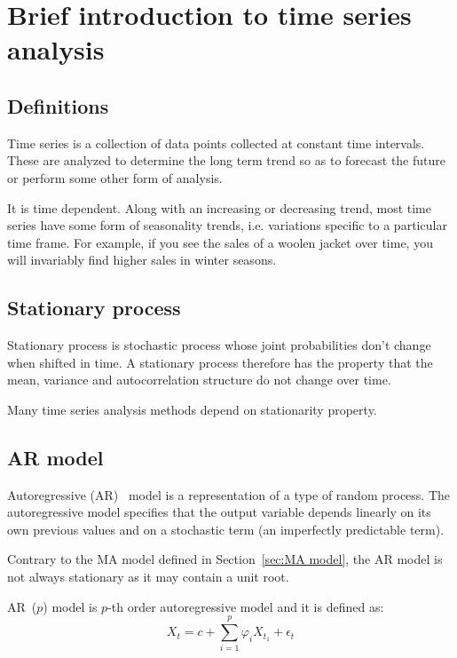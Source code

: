 
\chapter{Brief introduction to time series analysis}
\label{chap:Brief introduction to time series analysis}

\section{Definitions}
\label{sec:Definitions}

Time series is a collection of data points collected at constant time intervals. These are analyzed to determine the long term trend so as to forecast the future or perform some other form of analysis.

It is time dependent. Along with an increasing or decreasing trend, most time series have some form of seasonality trends, i.e. variations specific to a particular time frame. For example, if you see the sales of a woolen jacket over time, you will invariably find higher sales in winter seasons.

\section{Stationary process}
\label{sec:Stationary process}

Stationary process is stochastic process whose joint probabilities don't change when shifted in time. A stationary process therefore has the property that the mean, variance and autocorrelation structure do not change over time.

Many time series analysis methods depend on stationarity property.

\section{AR model}
\label{sec:AR model}

Autoregressive (AR)~\autocite{tsa} model is a representation of a type of random process. The autoregressive model specifies that the output variable depends linearly on its own previous values and on a stochastic term (an imperfectly predictable term).

Contrary to the MA model defined in Section~\ref{sec:MA model}, the AR model is not always stationary as it may contain a unit root.

AR~($p$) model is $p$-th order autoregressive model and it is defined as:
\begin{equation*}
  X_t = c + \sum_{i=1}^p{\varphi_i X_{t_1}} + \epsilon_t
\end{equation*}

